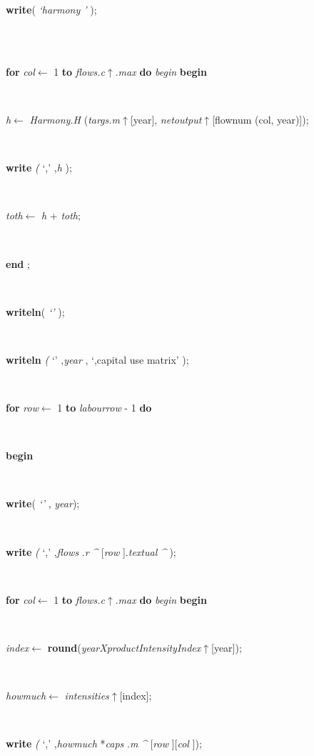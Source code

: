 \documentclass[10pt, a4paper]{article}
\begin{document}
\begin{tabbing}
\parbox{14cm}{\textsf{\textbf{write}(\textit{\textrm{\textup { `harmony  ' } }})}; }\\
\\
\+\<\parbox{14cm}{\textsf {\textbf {for } \textsf{\textit{col}$\leftarrow$ 1} \textbf{ to } \textsf{\textit{flows.c}$\uparrow$.\textit{max}} \textbf{ do } \textsf{\textit{begin}} \textbf{ begin } }}\\
\parbox{14cm}{\textsf{\textit{h}$\leftarrow$ \textit{Harmony.H} (\textit{targs.m}$\uparrow$\textit{}[year], \textit{netoutput}$\uparrow$\textit{}[flownum (col, year)])}; }\\
\parbox{14cm}{\textsf{\textbf{write}  \textit{(} \textrm{\textup { `,' } },\textit{h} );}}\\
\parbox{14cm}{\textsf{\textit{toth}$\leftarrow$ \textit{h} + \textit{toth}}; }\\
\<\-\parbox{14cm}{\textsf{\textbf{end} ;}}\\
\parbox{14cm}{\textsf{\textbf{writeln}(\textit{\textrm{\textup { `' } }})}; }\\
\parbox{14cm}{\textsf{\textbf{writeln} \textit{(} \textrm{\textup { `' } },\textit{year} ,\textrm{\textup { `,capital use matrix' } });}}\\
\+\parbox{14cm}{\textsf {\textbf {for } \textsf{\textit{row}$\leftarrow$ 1} \textbf{ to } \textsf{\textit{labourrow} - 1} \textbf{ do } }}\\
\<\parbox{14cm}{\textsf{\textbf{begin} }}\\
\parbox{14cm}{\textsf{\textbf{write}(\textit{\textrm{\textup { `' } }}, \textit{year})}; }\\
\parbox{14cm}{\textsf{\textbf{write} \textit{(} \textrm{\textup { `,' } },\textit{flows} .\textit{r} \textit{\^{}} [\textit{row} ].\textit{textual} \textit{\^{}} );}}\\
\+\<\parbox{14cm}{\textsf {\textbf {for } \textsf{\textit{col}$\leftarrow$ 1} \textbf{ to } \textsf{\textit{flows.c}$\uparrow$.\textit{max}} \textbf{ do } \textsf{\textit{begin}} \textbf{ begin } }}\\
\parbox{14cm}{\textsf{\textit{index}$\leftarrow$ \textbf{round}(\textit{yearXproductIntensityIndex}$\uparrow$\textit{}[year])}; }\\
\parbox{14cm}{\textsf{\textit{howmuch}$\leftarrow$ \textit{intensities}$\uparrow$\textit{}[index]}; }\\
\parbox{14cm}{\textsf{\textbf{write} \textit{(} \textrm{\textup { `,' } },\textit{howmuch} *\textit{caps} .\textit{m} \textit{\^{}} [\textit{row} ][\textit{col} ]);}}\\

\end{tabbing}
\end{document}

